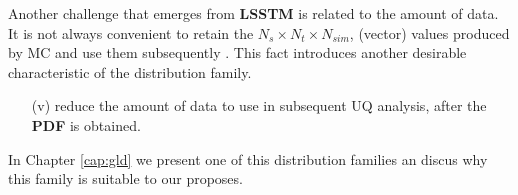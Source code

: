 Another challenge that emerges from \textbf{LSSTM} is related to the amount of data. It is not always convenient to retain the $N_{s}\times N_{t}\times N_{sim}$, (vector) values produced by MC and use them subsequently \cite{Cox2012}. This fact introduces another desirable characteristic of the distribution family.

\begin{itemize}
\item[(v)] reduce the amount of data to use in subsequent UQ analysis, after the \textbf{PDF} is obtained. 
\end{itemize}

In Chapter \ref{cap:gld} we present one of this distribution families an discus why this family is suitable to our proposes. 

